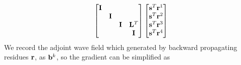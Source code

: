 \documentclass[revised,endfloat]{geophysics}
\begin{document}
\begin{equation}
\begin{split}
\begin{bmatrix}
{\bf I} & & & \\
 & {\bf I} & & \\
 & &  {\bf I}& {\bf L}^T \\
 & & & {\bf I} \\
\end {bmatrix}
\begin{bmatrix}
{\bf s}^T {\bf r}^1 \\
{\bf s}^T {\bf r}^2 \\
{\bf s}^T {\bf r}^3 \\
{\bf s}^T {\bf r}^4 \\
\end{bmatrix}            \\
\end{split}
\label{eq57}
\end{equation}
We record the adjoint wave field which generated by backward propagating residues ${\bf r}$, as ${\bf b}^k$, so the gradient can be simplified as 
\end{document}
